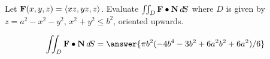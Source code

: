 \documentclass{ximera}
\author{David Guichard \and Neal Koblitz \and H. Jerome Keisler \and Albert Scheller \and Barry Balof \and Mike Wills \and Matthew Carr}
\begin{document}
\begin{exercise}




Let $\mathbf{F}(x,y,z)=\left\langle xz,yz,z\right\rangle$. Evaluate $\iint_{D}\mathbf{F}\bullet\mathbf{N}\mathop{}\!d\! S$ where $D$ is given by $z=a^2-x^2-y^2$, $x^2+y^2\le b^2$, oriented upwards.

\begin{prompt}
\[
\iint_{D}\vec{F}\dotp\vec{N}\d S=\answer{\pi b^2(-4b^4-3b^2+6a^2 b^2+6a^2)/6}
\]
\end{prompt}


\end{exercise}
\end{document}
